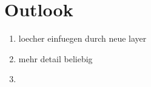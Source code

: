 \chapter{Outlook}
\label{sec:outloook}
\begin{enumerate}
    \item loecher einfuegen durch neue layer
    \item mehr detail beliebig
    \item 
\end{enumerate}